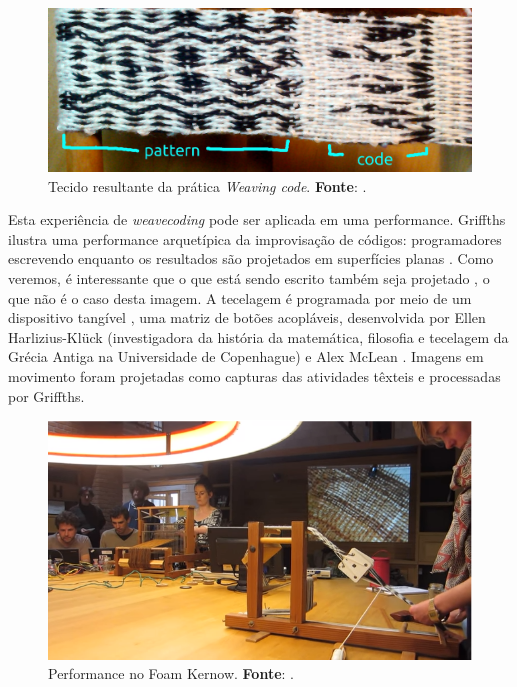 \begin{figure}[!h]
    \centering
    \includegraphics[scale=0.31]{imagens/weaving.jpg}
    \caption{Tecido resultante da prática \emph{Weaving code}. \textbf{Fonte}: .}
  \label{fig:weaving}
\end{figure}

Esta experiência de \emph{weavecoding} pode ser aplicada em uma performance. Griffths ilustra uma performance arquetípica da improvisação de códigos: programadores escrevendo enquanto os resultados são projetados em superfícies planas . Como veremos, é interessante que o que está sendo escrito também seja projetado \cite[p.~129]{McLean2011}, o que não é o caso desta imagem. A tecelagem é programada por meio de um dispositivo tangível , uma matriz de botões acopláveis, desenvolvida por Ellen Harlizius-Klück (investigadora da história da matemática, filosofia e tecelagem da Grécia Antiga na Universidade de Copenhague) e Alex McLean . Imagens em movimento foram projetadas como capturas das atividades têxteis e processadas por Griffths. 

\begin{figure}[h]
  \centering
  \includegraphics[scale=0.65]{imagens/weaving.png}
  \caption{Performance no Foam Kernow. \textbf{Fonte}: .}
  \label{fig:weavecoding}
\end{figure}

